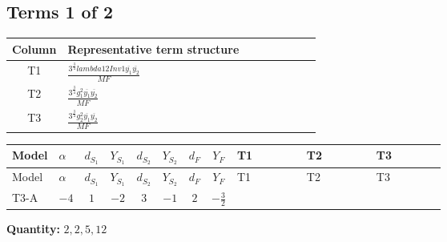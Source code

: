 \documentclass[8pt]{article}
\begin{document}
\begin{landscape}
\subsection*{Terms 1 of 2}
\begin{center}
\begin{tabular}{@{}c >{\raggedright\arraybackslash}p{0.82\linewidth}@{}}
\toprule
Column & Representative term structure \\
\midrule
T1 & \(\displaystyle \frac{3^{\frac{3}{4}} lambda12Inv1 \overline{y_{1}} \overline{y_{2}}}{MF}\) \\
\midrule
T2 & \(\displaystyle \frac{3^{\frac{3}{4}} g_{1}^{2} \overline{y_{1}} \overline{y_{2}}}{MF}\) \\
\midrule
T3 & \(\displaystyle \frac{3^{\frac{3}{4}} g_{2}^{2} \overline{y_{1}} \overline{y_{2}}}{MF}\) \\
\midrule
\bottomrule
\end{tabular}
\end{center}
\smallskip
\tiny
\begin{longtable}{@{}llcccccc >{\raggedright\arraybackslash}p{0.21\linewidth} >{\raggedright\arraybackslash}p{0.21\linewidth} >{\raggedright\arraybackslash}p{0.21\linewidth}@{}}
\toprule
Model & $\alpha$ & $d_{S_1}$ & $Y_{S_1}$ & $d_{S_2}$ & $Y_{S_2}$ & $d_F$ & $Y_F$ & T1 & T2 & T3 \\
\midrule
\endfirsthead
\toprule
Model & $\alpha$ & $d_{S_1}$ & $Y_{S_1}$ & $d_{S_2}$ & $Y_{S_2}$ & $d_F$ & $Y_F$ & T1 & T2 & T3 \\
\midrule
\endhead
T3-A & $-4$ & $1$ & $-2$ & $3$ & $-1$ & $2$ & $-\frac{3}{2}$ & \scriptsize\adjustbox{max width=\linewidth}{$\begin{gathered} \frac{3^{\frac{3}{4}} lambda12Inv1 \overline{y_{1}} \overline{y_{2}}}{6 MF}\end{gathered}$} & \scriptsize\adjustbox{max width=\linewidth}{$\begin{gathered} \frac{9 \cdot 3^{\frac{3}{4}} g_{1}^{2} \overline{y_{1}} \overline{y_{2}}}{8 MF}\end{gathered}$} & \scriptsize\adjustbox{max width=\linewidth}{$\begin{gathered} \frac{11 \cdot 3^{\frac{3}{4}} g_{2}^{2} \overline{y_{1}} \overline{y_{2}}}{8 MF}\end{gathered}$} \\
\midrule
\bottomrule
\end{longtable}
\clearpage
\noindent\textbf{Quantity: }$\mathrm{2,2,5,12}$\par\smallskip

\end{landscape}
\end{document}
